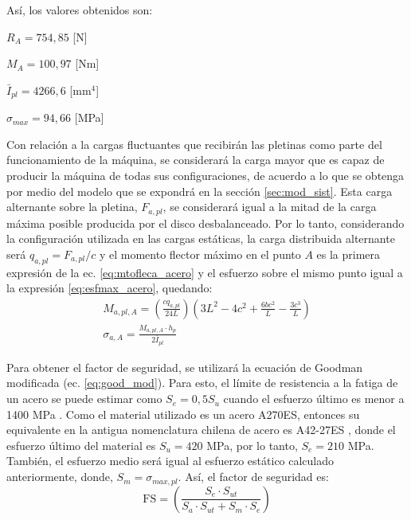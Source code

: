 Así, los valores obtenidos son:
\begin{itemize*}
	\item $R_A = 754,85$ [N]
	\item $M_A = 100,97$ [Nm]
	\item $\bar{I}_{pl} = 4266,6$ [mm$^4$]
	\item $\sigma_{max} = 94,66$ [MPa]
\end{itemize*}

Con relación a la cargas fluctuantes que recibirán las pletinas como parte del funcionamiento de la máquina, se considerará la carga mayor que es capaz de producir la máquina de todas sus configuraciones, de acuerdo a lo que se obtenga por medio del modelo que se expondrá en la sección \ref{sec:mod_sist}. Esta carga alternante sobre la pletina, $F_{a,pl}$, se considerará igual a la mitad de la carga máxima posible producida por el disco desbalanceado. Por lo tanto, considerando la configuración utilizada en las cargas estáticas, la carga distribuida alternante será $q_{a,pl} = F_{a,pl}/c$ y el momento flector máximo en el punto $A$ es la primera expresión de la ec. \ref{eq:mtofleca_acero} y el esfuerzo sobre el mismo punto igual a la expresión \ref{eq:esfmax_acero}, quedando:
\begin{gather}
	M_{a,pl,A} = \left(\frac{cq_{a,pl}}{24L}\right) \left(3L^2 - 4c^2 + \frac{6bc^2}{L} - \frac{3c^3}{L}\right)\\
	\sigma_{a,A} = \frac{M_{a,pl,A} \cdot h_p}{2\bar{I}_{pl}}
\end{gather}

Para obtener el factor de seguridad, se utilizará la ecuación de Goodman modificada (ec. \ref{eq:good_mod}). Para esto, el límite de resistencia a la fatiga de un acero se puede estimar como $S_e = 0,5S_{u}$ cuando el esfuerzo último es menor a 1400 MPa \cite{budynas2008shigley}. Como el material utilizado es un acero A270ES, entonces su equivalente en la antigua nomenclatura chilena de acero es A42-27ES \cite{nch203}, donde el esfuerzo último del material es $S_{u} = 420$ MPa, por lo tanto, $S_e = 210$ MPa. También, el esfuerzo medio será igual al esfuerzo estático calculado anteriormente, donde, $S_m = \sigma_{max,pl}$. Así, el factor de seguridad es:
\begin{equation}
	\text{FS} = \left(\frac{S_e\cdot S_{ut}}{S_a\cdot S_{ut} + S_m\cdot S_e}\right)
\end{equation}


